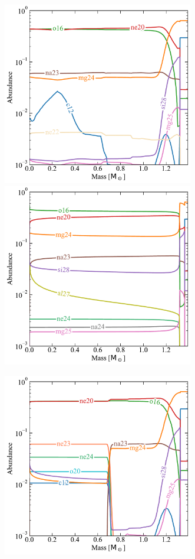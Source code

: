 \documentclass[main.tex]{subfiles}
\begin{document}
\begin{subappendices}
\begin{figure}[hbt!]
    \centering
    \includegraphics[height=8cm]{figures/chapter2/abundances/2p5_logRho_9_abun.pdf}\quad
    \includegraphics[height=8cm]{figures/chapter2/abundances/2p5_final_abun.pdf}\par\medskip
    \includegraphics[height=8cm]{figures/chapter2/abundances/2p5_abun_carbon_sup.pdf}

\end{figure}
\end{subappendices}
\end{document}
